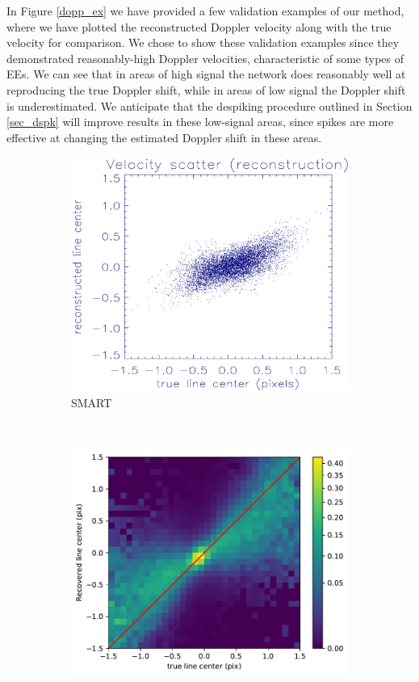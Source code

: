 \documentclass[10pt,letterpaper, doublespace]{article}
\newcommand{\EEs}{\acp{EE}}
\begin{document}
			In Figure \ref{dopp_ex} we have provided a few validation examples of our method, where we have plotted the reconstructed Doppler velocity along with the true velocity for comparison. 
			We chose to show these validation examples since they demonstrated reasonably-high Doppler velocities, characteristic of some types of \EEs.
			We can see that in areas of high signal the network does reasonably well at reproducing the true Doppler shift, while in areas of low signal the Doppler shift is underestimated.
			We anticipate that the despiking procedure outlined in Section \ref{sec_dspk} will improve results in these low-signal areas, since spikes are more effective at changing the estimated Doppler shift in these areas.
			
			\begin{figure}[t!]
				\centering
				\begin{subfigure}[t]{0.45\textwidth}
					\centering
					\includegraphics[width=\textwidth]{fig/smart_hist}
					\caption{SMART}
					\label{smart_hist}
				\end{subfigure}%
				~ 
				\begin{subfigure}[t]{0.45\textwidth}
					\centering	
					\includegraphics[width=\textwidth]{fig/linearity}

\end{subfigure}
\end{figure}
\end{document}
